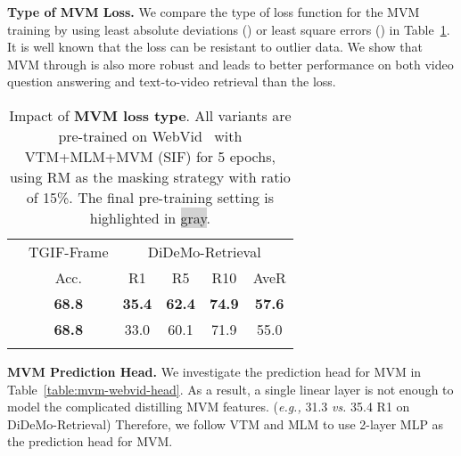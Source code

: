\documentclass[10pt,twocolumn,letterpaper]{article}
\newlength\savewidth
\newcommand\shline{\noalign{\global\savewidth\arrayrulewidth\global\arrayrulewidth 1pt}\hline\noalign{\global\arrayrulewidth\savewidth}}
\newcommand{\tablestyle}[2]{\setlength{\tabcolsep}{#1}\renewcommand{\arraystretch}{#2}\centering\footnotesize}
\newcommand{\siftgif}{68.8\xspace}
\newcommand{\sifdro}{35.4\xspace}
\newcommand{\sifdrf}{62.4\xspace}
\newcommand{\sifdrt}{74.9\xspace}
\newcommand{\sifaver}{57.6\xspace}
\begin{document}
\vspace{0.5ex}
\noindent \textbf{Type of MVM Loss.} We compare the type of loss function for the MVM training by using least absolute deviations () or least square errors () in Table~\ref{table:mvm-webvid-loss}. It is well known that the  loss can be resistant to outlier data. We show that MVM through  is also more robust and leads to better performance on both video question answering and text-to-video retrieval than the  loss.
\vspace{-2ex}
\begin{table}[H]
\centering
    \tablestyle{8pt}{1.2} 
    \def \w{20pt} 
\begin{tabular}{c| ccccc}
        \shline
        \multirow{2}{*}{MVM Loss} & TGIF-Frame & \multicolumn{4}{c}{DiDeMo-Retrieval} \\
        \cmidrule(lr){2-2}\cmidrule(lr){3-6}
        & Acc. & R1 & R5 & R10 & AveR \\
        \hline
        \rowcolor{lightgray}
          & \textbf{\siftgif} & \textbf{\sifdro} & \textbf{\sifdrf} & \textbf{\sifdrt} & \textbf{\sifaver}\\
          & \textbf{68.8} & 33.0 & 60.1 & 71.9 & 55.0\\
\shline
    \end{tabular}
\caption{Impact of \textbf{MVM loss type}. All variants are pre-trained on WebVid~\cite{bain2021frozen} with VTM+MLM+MVM (SIF) for 5 epochs, using RM as the masking strategy with ratio of 15\%. The final pre-training setting is highlighted in \colorbox{lightgray}{gray}.}
    \label{table:mvm-webvid-loss}
\end{table} 
\vspace{0.5ex}
\noindent \textbf{MVM Prediction Head.} We investigate the prediction head for MVM in Table~\ref{table:mvm-webvid-head}. As a result, a single linear layer is not enough to model the complicated distilling MVM features. (\textit{e.g.,} 31.3 \textit{vs.} 35.4 R1 on DiDeMo-Retrieval)
Therefore, we follow VTM and MLM to use 2-layer MLP as the prediction head for MVM.
\vspace{-2ex}
\end{document}

